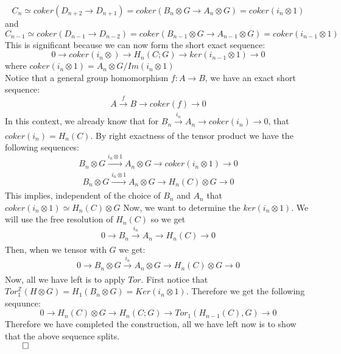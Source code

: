 \documentclass[11pt]{article}
\theoremstyle{definition}
\begin{document}
\begin{enumerate}
    $$C_n\simeq coker(D_{n+2}\rightarrow D_{n+1})=coker(B_n\otimes G\rightarrow A_n\otimes G)=coker(i_n\otimes 1)$$
    and 
    $$C_{n-1}\simeq coker(D_{n-1}\rightarrow D_{n-2})=coker(B_{n-1}\otimes G\rightarrow A_{n-1}\otimes G)=coker(i_{n-1}\otimes 1)$$
    This is significant because we can now form the short exact sequence:
    $$0\rightarrow coker(i_n\otimes)\rightarrow H_n(C;G)\rightarrow ker(i_{n-1}\otimes 1)\rightarrow 0$$
    where $coker(i_n\otimes 1)=A_n\otimes G/Im(i_n\otimes1)$\\
    Notice that a general group homomorphism $f:A\rightarrow B$, we have an exact short sequence: $$A\xrightarrow[]{f}B\rightarrow coker(f)\rightarrow 0$$
    In this context, we already know that for $B_n\xrightarrow[]{i_n}A_n\rightarrow coker(i_n)\rightarrow 0$, that $coker(i_n)=H_n(C)$. By right exactness of the tensor product we have the following sequences: 
    $$B_n\otimes G\xrightarrow[]{i_n \otimes 1}A_n\otimes G\rightarrow coker(i_n\otimes 1)\rightarrow 0$$
    $$B_n\otimes G\xrightarrow[]{i_n \otimes 1}A_n\otimes G\rightarrow H_n(C)\otimes G\rightarrow 0$$
    This implies, independent of the choice of $B_n$ and $A_n$ that $ coker(i_n\otimes 1)\simeq  H_n(C)\otimes G$
    Now, we want to determine the $ker(i_{n}\otimes 1)$. We will use the free resolution of $H_n(C)$ so we get $$0\rightarrow B_n\xrightarrow[]{i_n}A_n\rightarrow H_n(C)\rightarrow 0$$ 
    Then, when we tensor with $G$ we get:
    $$0\rightarrow B_n\otimes G\xrightarrow[]{i_n}A_n\otimes G\rightarrow H_n(C)\otimes G\rightarrow 0$$
    Now, all we have left is to apply $Tor$. First notice that $Tor^{\mathbb{Z}}_1(H\otimes G)=H_1(B_n\otimes G)=Ker(i_n\otimes 1)$. Therefore we get the following sequunce:
    $$0\rightarrow H_n(C)\otimes G \rightarrow H_n(C;G)\rightarrow Tor_1(H_{n-1}(C),G)\rightarrow 0$$
    Therefore we have completed the construction, all we have left now is to show that the above sequence splits.\\
    $\qed$
\end{enumerate}
\end{document}

